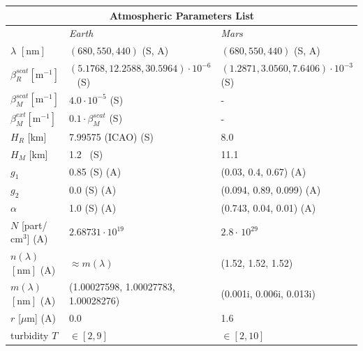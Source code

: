 \documentclass[journal]{vgtc}                %
\newcommand{\review}[1]{{\color{blue}#1}}
\begin{document}
\begingroup
\setlength{\tabcolsep}{0.2em}
\begin{table}[t]
\review{
  \centering
  \begin{tabular}{|p{1.5cm}|p{3.2cm} p{3.2cm}|}
    \hline
    \multicolumn{3}{|c|}{\textbf{Atmospheric Parameters List}} \\ [0.5ex] 
    \hline
    & \textit{Earth} & \textit{Mars}\\
    {\small $\lambda$ $[\text{nm}]$} & {\small $(680, 550, 440)$ (S, A)} & {\small $(680, 550, 440)$ (S, A)} \\
    {\small $\beta_R^{scat} [\text{m}^{-1}]$} & {\tiny $(5.1768, 12.2588, 30.5964) \cdot 10^{-6}$~\cite{Bucholtz:1995} (S)} & {\tiny $(1.2871, 3.0560, 7.6406) \cdot 10^{-3}$ (S)} \\
    {\small $\beta_M^{scat} [\text{m}^{-1}]$} & {\small $4.0 \cdot 10^{-5}$ (S)} & {\small -} \\
    {\small $\beta_M^{ext} [\text{m}^{-1}]$} & {\small $0.1 \cdot \beta_M^{scat}$ (S)} & {\small -} \\
    {\small $H_R$ [km]} & {\small 7.99575 (ICAO) (S)} & {\small 8.0~\cite{Ho:2002}}\\
    {\small $H_M$ [km]} & {\small 1.2~\cite{Morales:2017} (S)} & {\small 11.1}\\
    {\small $g_1$} & {\small 0.85 (S) (A)} & {\small (0.03, 0.4, 0.67) (A)}\\ %
    {\small $g_2$} & {\small 0.0 (S) (A)} & {\small (0.094, 0.89, 0.099) (A)~\cite{Chen:2019}}\\
    {\small $\alpha$} & {\small 1.0 (S) (A)} & {\small (0.743, 0.04, 0.01) (A)~\cite{Chen:2019}}\\
    {\tiny $N$ [part/$\text{cm}^3$] (A)} & {\small $2.68731 \cdot 10^{19}$~\cite{Penndorf:1957}} & {\small $2.8 \cdot \, 10^{29}$~\cite{Ho:2002}}\\
    {\tiny $n(\lambda)$ $[\text{nm}]$ (A)} & {\small $\approx m(\lambda)$} & {\small (1.52, 1.52, 1.52)}\\
    {\tiny $m(\lambda)$ $[\text{nm}]$ (A)} & {\tiny (1.00027598, 1.00027783, 1.00028276)~\cite{Penndorf:1957} } & {\tiny (0.001i, 0.006i, 0.013i)~\cite{Ehlers:2014}}\\
    {\small $r$ [$\mu\text{m}$] (A)} & {\small 0.0} & {\small 1.6~\cite{Ehlers:2014}}\\
    {\small turbidity $T$} & {\small $\in [2, 9]$} & {\small $\in [2, 10]$}\\

\end{tabular}}
\end{table}
\end{document}
